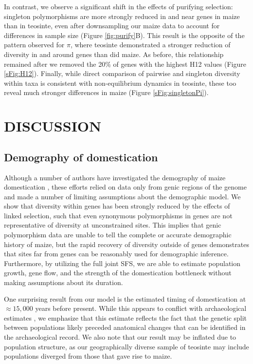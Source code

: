 \documentclass[twoside, twocolumn, letterpaper]{article}
\begin{document}
In contrast, we observe a significant shift in the effects of purifying selection: singleton polymorphisms are more strongly reduced in and near genes in maize than in teosinte, even after downsampling our maize data to account for differences in sample size (Figure \ref{fig:purify}B). 
This result is the opposite of the pattern observed for $\pi$, where teosinte demonstrated a stronger reduction of diversity in and around genes than did maize. 
As before, this relationship remained after we removed the 20\% of genes with the highest H12 values (Figure \ref{sFig:H12}).
Finally, while direct comparison of pairwise and singleton diversity within taxa is consistent with   non-equilibrium dynamics in teosinte, these too reveal much stronger differences in maize (Figure \ref{sFig:singletonPi}).



\section*{DISCUSSION}


\subsection*{Demography of domestication} %
Although a number of authors have investigated the demography of maize domestication \cite{eyre1998, tenaillon2004, wright2005}, these  efforts relied on data only from genic regions of the genome and made a number of limiting assumptions about the demographic model.  We show that diversity within genes has been strongly reduced by the effects of linked selection, such that even synonymous polymorphisms in genes are not representative of diversity at unconstrained sites. This implies that genic polymorphism data are unable to tell the complete or accurate demographic history of maize, but the rapid recovery of diversity outside of genes demonstrates that sites far from genes can be reasonably used for demographic inference. Furthermore, by utilizing the full joint SFS, we are able to estimate population growth, gene flow, and the strength of the domestication bottleneck without making assumptions about its duration.  

One surprising result from our model is the estimated timing of domestication at $\approx 15,000$ years before present.
While this appears to conflict with archaeological estimates \cite{piperno2009}, we emphasize that this estimate reflects the fact that the genetic split between populations likely preceded anatomical changes that can be identified in the archaeological record. 
We also note that our result may be inflated due to population structure, as our geographically diverse sample of teosinte may include populations diverged from those that gave rise to maize.
\end{document}
